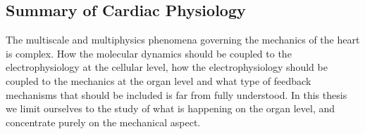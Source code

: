 \subsection{Summary of Cardiac Physiology}
The multiscale and multiphysics phenomena governing the mechanics of
the heart is complex. How the molecular dynamics should be coupled to
the electrophysiology at the cellular level, how the electrophysiology
should be coupled to the mechanics at the organ level and what type of
feedback mechanisms that should be included is far from fully
understood. In this thesis we limit ourselves to the study of what is
happening on the organ level, and concentrate purely on the mechanical
aspect. 


